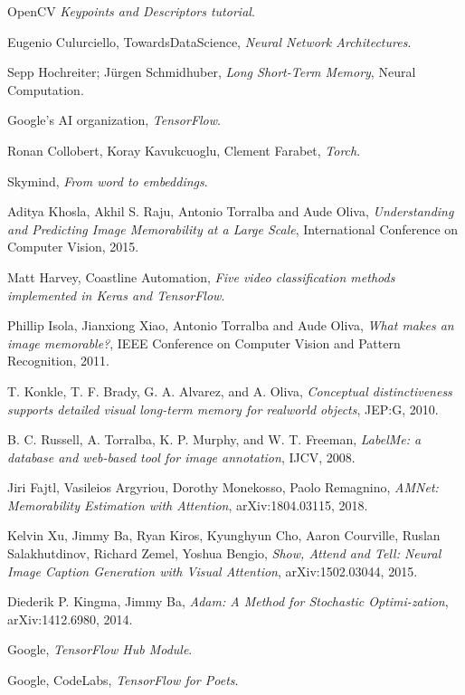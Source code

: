 \begin{thebibliography}{}
	OpenCV
	\emph{Keypoints and Descriptors tutorial}.


	Eugenio Culurciello, TowardsDataScience,
	\emph{Neural Network Architectures}.

	Sepp Hochreiter; Jürgen Schmidhuber,
	\emph{Long Short-Term Memory},
	Neural Computation.

	Google’s AI organization,
	\emph{TensorFlow}.


	Ronan Collobert, Koray Kavukcuoglu, Clement Farabet,
    \emph{Torch}.

	Skymind,
    \emph{From word to embeddings}.

	Aditya Khosla, Akhil S. Raju, Antonio Torralba and Aude Oliva,
	\emph{Understanding and Predicting Image Memorability at a Large Scale},
	International Conference on Computer Vision,
	2015.

	Matt Harvey, Coastline Automation,
	\emph{Five video classification methods implemented in Keras and TensorFlow}.

	Phillip Isola, Jianxiong Xiao, Antonio Torralba and Aude Oliva,
	\emph{What makes an image memorable?},
	IEEE Conference on Computer Vision and Pattern Recognition,
	2011.

	T. Konkle, T. F. Brady, G. A. Alvarez, and A. Oliva,
	\emph{Conceptual distinctiveness supports detailed visual long-term memory for realworld objects},
	JEP:G, 2010.

	B. C. Russell, A. Torralba, K. P. Murphy, and W. T. Freeman,
	\emph{LabelMe: a database and web-based tool for image annotation},
	IJCV, 2008.

	Jiri Fajtl, Vasileios Argyriou, Dorothy Monekosso, Paolo Remagnino,
	\emph{AMNet: Memorability Estimation with Attention},
	arXiv:1804.03115, 2018.

	Kelvin Xu, Jimmy Ba, Ryan Kiros, Kyunghyun Cho, Aaron Courville, Ruslan Salakhutdinov, Richard Zemel, Yoshua Bengio,
	\emph{Show, Attend and Tell: Neural Image Caption Generation with Visual Attention},
	arXiv:1502.03044, 2015.

	Diederik P. Kingma, Jimmy Ba,
	\emph{Adam: A Method for Stochastic Optimi-zation},
	arXiv:1412.6980, 2014.

	Google,
	\emph{TensorFlow Hub Module}.

	Google, CodeLabs,
	\emph{TensorFlow for Poets}.

\end{thebibliography}